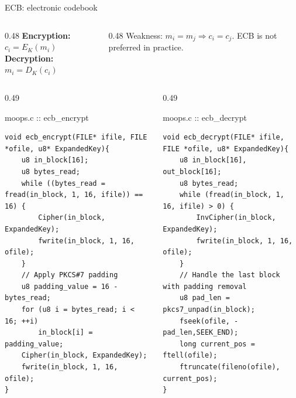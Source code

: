 \documentclass[aspectratio=169,10pt]{beamer}
\newcommand{\codesmall}{\lstset{basicstyle=\ttfamily\fontsize{5.5}{6.4}\selectfont}}
\newcommand{\codenormal}{\lstset{basicstyle=\ttfamily\fontsize{5.9}{6.9}\selectfont}}
\begin{document}
\begin{frame}[fragile]{ECB: electronic codebook}
\begin{columns}[T]
\begin{column}{0.48\textwidth}
\footnotesize
\textbf{Encryption:}\quad $c_i=E_K(m_i)$\\[2pt]
\textbf{Decryption:}\quad $m_i=D_K(c_i)$
\end{column}
\begin{column}{0.48\textwidth}
\footnotesize
\alert{Weakness}: $m_i=m_j\Rightarrow c_i=c_j$. 
ECB is not preferred in practice.
\end{column}
\end{columns}
\vskip4pt
\codesmall
\begin{columns}[T]
\begin{column}{0.49\textwidth}
\begin{tbox}{moops.c :: ecb\_encrypt}
\begin{lstlisting}
void ecb_encrypt(FILE* ifile, FILE *ofile, u8* ExpandedKey){
    u8 in_block[16];
    u8 bytes_read;
    while ((bytes_read = fread(in_block, 1, 16, ifile)) == 16) {
        Cipher(in_block, ExpandedKey);
        fwrite(in_block, 1, 16, ofile);
    }
    // Apply PKCS#7 padding
    u8 padding_value = 16 - bytes_read;
    for (u8 i = bytes_read; i < 16; ++i)
        in_block[i] = padding_value;
    Cipher(in_block, ExpandedKey);
    fwrite(in_block, 1, 16, ofile);
}
\end{lstlisting}
\end{tbox}
\end{column}
\begin{column}{0.49\textwidth}
\begin{tbox}{moops.c :: ecb\_decrypt}
\begin{lstlisting}
void ecb_decrypt(FILE* ifile, FILE *ofile, u8* ExpandedKey){
    u8 in_block[16], out_block[16];
    u8 bytes_read;
    while (fread(in_block, 1, 16, ifile) > 0) {
        InvCipher(in_block, ExpandedKey);
        fwrite(in_block, 1, 16, ofile);
    }
    // Handle the last block with padding removal
    u8 pad_len = pkcs7_unpad(in_block);
    fseek(ofile, -pad_len,SEEK_END);
    long current_pos = ftell(ofile);
    ftruncate(fileno(ofile), current_pos);
}
\end{lstlisting}
\end{tbox}
\end{column}
\end{columns}
\codenormal
{}
\end{frame}
\end{document}
